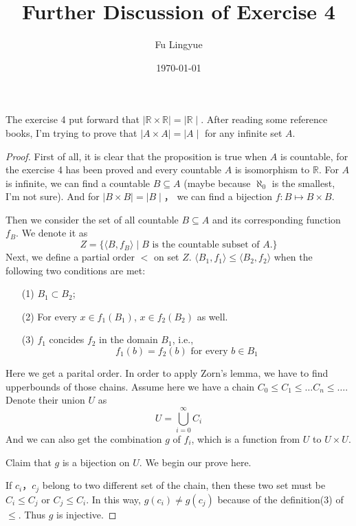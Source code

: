 \documentclass{article}
\title{Further Discussion of Exercise 4}
\author{Fu Lingyue}
\date{\today}
\begin{document}
    \maketitle
    The exercise 4 put forward that 
    $\mid\mathbb{R} \times \mathbb{R}\mid = \mid \mathbb R\mid$.
    After reading some reference books, I'm trying to prove that 
    $\mid A\times A\mid = \mid A\mid$ for any infinite set $A$.


    \begin{proof}
    First of all, 
    it is clear that the proposition is true when $A$ is countable, 
    for the exercise 4 has been proved and every countable $A$ is isomorphism to $\mathbb R$.
    For $A$ is infinite, we can find a countable $B\subseteq A$ 
    (maybe because $\aleph_0$ is the smallest, I'm not sure).
    And for $\mid B\times B\mid = \mid B\mid$， 
    we can find a bijection $f: B\mapsto B\times B.$

    Then we consider the set of all countable $B \subseteq A$ and
    its corresponding function $f_B$. We denote it as
    $$Z = \{ \langle B,f_B\rangle  \mid B\text{ is the countable subset of }A.\}$$
    Next, we define a partial order $ < $ on set $Z$. 
    $\langle B_1,f_1\rangle  \leq \langle B_2,f_2\rangle $ when the following two conditions are met:
    \begin{enumerate}
        \item[(1)] $B_1 \subset B_2$;
        \item[(2)]  For every $x \in f_1(B_1)$, $x \in f_2(B_2)$ as well.
        \item[(3)]  $f_1$ concides $f_2$ in the domain $B_1$, i.e., 
        $$f_1(b) = f_2(b) \text{ for every }b\in B_1$$  
        
    \end{enumerate}
    
    Here we get a parital order.
    In order to apply Zorn's lemma, we have to find upperbounds of those chains.
    Assume here we have a chain $C_0 \leq C_1 \leq \dots C_n\leq \dots$.
    Denote their union $U$ as 
    $$ U = \bigcup_{i =0}^\infty C_i$$
    And we can also get the combination $g$ of $f_i$, 
    which is a function from $U$ to $U \times U$.

    Claim that $g$ is a bijection on $U$. 
    We begin our prove here.
        
    If $c_i，c_j$ belong to two different set of the chain, 
        then these two set must be $C_i \leq C_j$ or $C_j \leq C_i$.
        In this way, $g(c_i) \not= g(c_j)$ because of the definition(3) of $\leq$.
        Thus $g$ is injective.


\end{proof}
\end{document}
